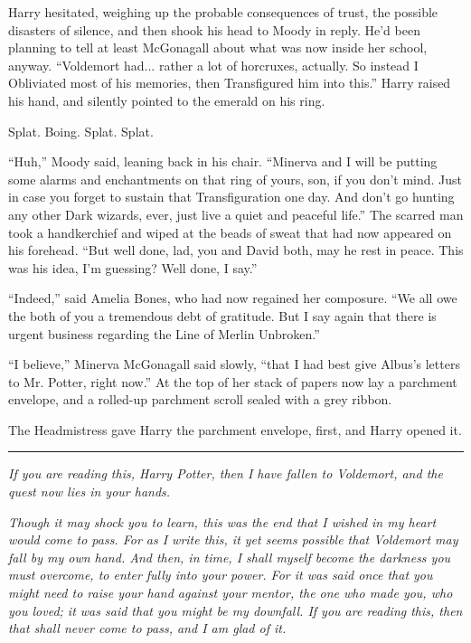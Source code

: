 Harry hesitated, weighing up the probable consequences of trust, the possible disasters of silence, and then shook his head to Moody in reply. He'd been planning to tell at least McGonagall about what was now inside her school, anyway. ``Voldemort had... rather a lot of horcruxes, actually. So instead I Obliviated most of his memories, then Transfigured him into this.'' Harry raised his hand, and silently pointed to the emerald on his ring.

Splat. Boing. Splat. Splat.

``Huh,'' Moody said, leaning back in his chair. ``Minerva and I will be putting some alarms and enchantments on that ring of yours, son, if you don't mind. Just in case you forget to sustain that Transfiguration one day. And don't go hunting any other Dark wizards, ever, just live a quiet and peaceful life.'' The scarred man took a handkerchief and wiped at the beads of sweat that had now appeared on his forehead. ``But well done, lad, you and David both, may he rest in peace. This was his idea, I'm guessing? Well done, I say.''

``Indeed,'' said Amelia Bones, who had now regained her composure. ``We all owe the both of you a tremendous debt of gratitude. But I say again that there is urgent business regarding the Line of Merlin Unbroken.''

``I believe,'' Minerva McGonagall said slowly, ``that I had best give Albus's letters to Mr. Potter, right now.'' At the top of her stack of papers now lay a parchment envelope, and a rolled-up parchment scroll sealed with a grey ribbon.

The Headmistress gave Harry the parchment envelope, first, and Harry opened it.

\begin{center}\rule{3in}{0.4pt}\end{center}

\emph{If you are reading this, Harry Potter, then I have fallen to Voldemort, and the quest now lies in your hands.}

\emph{Though it may shock you to learn, this was the end that I wished in my heart would come to pass. For as I write this, it yet seems possible that Voldemort may fall by my own hand. And then, in time, I shall myself become the darkness you must overcome, to enter fully into your power. For it was said once that you might need to raise your hand against your mentor, the one who made you, who you loved; it was said that you might be my downfall. If you are reading this, then that shall never come to pass, and I am glad of it.}

